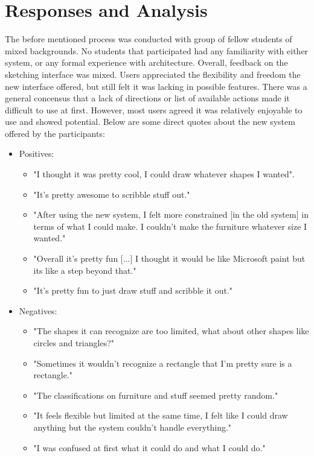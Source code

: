 \section{Responses and Analysis}
The before mentioned process was conducted with group of fellow students of mixed backgrounds. No students that participated had any familiarity with either system, or any formal experience with architecture. Overall, feedback on the sketching interface was mixed. Users appreciated the flexibility and freedom the new interface offered, but still felt it was lacking in possible features. There was a general concensus that a lack of directions or list of available actions made it difficult to use at first. However, most users agreed it was relatively enjoyable to use and showed potential. Below are some direct quotes about the new system offered by the participants:

\begin{itemize}
    \item Positives:
    \begin{itemize}
        \item  "I thought it was pretty cool, I could draw whatever shapes I wanted".
        \item "It's pretty awesome to scribble stuff out."
        \item "After using the new system, I felt more constrained [in the old system] in terms of what I could make. I couldn’t make the furniture whatever size I wanted."
        \item "Overall it’s pretty fun [...] I thought it would be like Microsoft paint but its like a step beyond that."
        \item "It's pretty fun to just draw stuff and scribble it out."
    \end{itemize}
    \item Negatives:
    \begin{itemize}
        \item "The shapes it can recognize are too limited, what about other shapes like circles and triangles?"
        
        \item "Sometimes it wouldn’t recognize a rectangle that I’m pretty sure is a rectangle."
        
        \item "The classifications on furniture and stuff seemed pretty random."
        
        \item "It feels flexible but limited at the same time, I felt like I could draw anything but the system couldn't handle everything."
        
        \item "I was confused at first what it could do and what I could do."
        
    \end{itemize}
\end{itemize}

